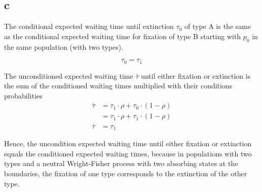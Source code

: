 \subsection{c}

The conditional expected waiting time until extinction $\tau_0$ of type A is the same as the conditional expected waiting time for fixation of type B starting with $p_0$ in the same population (with two types).

\[\tau_0  = \tau_1\]

The unconditioned expected waiting time $\bar{\tau}$ until either fixation or extinction is the sum of the conditioned waiting times multiplied with their conditions probabilities
\begin{align*}
\bar{\tau} &= \tau_1 \cdot \rho + \tau_0 \cdot (1-\rho)\\
&= \tau_1 \cdot \rho + \tau_1 \cdot (1-\rho)\\
\bar{\tau} &= \tau_1
\end{align*}

Hence, the uncondition expected waiting time until either fixation or extinction equals the conditioned expected waiting times, because in populations with two types and a neutral Wright-Fisher process with two absorbing states at the boundaries, the fixation of one type corresponds to the extinction of the other type.
